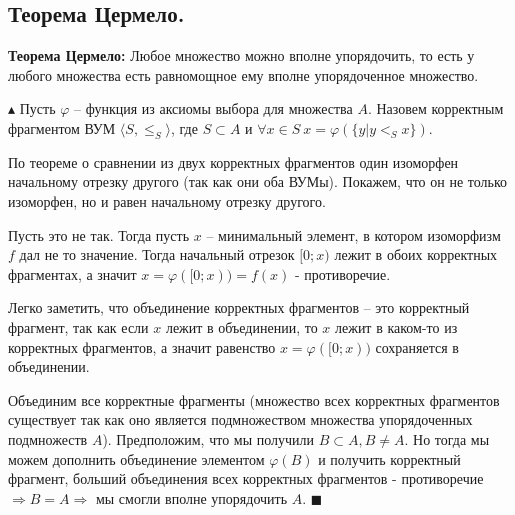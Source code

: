 \subsection{Теорема Цермело.}
\par \textbf{Теорема Цермело:} Любое множество можно вполне упорядочить, то есть у любого множества есть равномощное ему вполне упорядоченное множество.
\par $\blacktriangle$ Пусть $\varphi$ -- функция из аксиомы выбора для множества $A$. Назовем корректным фрагментом ВУМ $\langle S, \leq_S \rangle$, где $S \subset A$ и $\forall x \in S \: x=\varphi(\{y|y <_S x\})$.
\par По теореме о сравнении из двух корректных фрагментов один изоморфен начальному отрезку другого (так как они оба ВУМы). Покажем, что он не только изоморфен, но и равен начальному отрезку другого. 
\par Пусть это не так. Тогда пусть $x$ -- минимальный элемент, в котором изоморфизм $f$ дал не то значение. Тогда начальный отрезок $[0;x)$ лежит в обоих корректных фрагментах, а значит $x=\varphi([0;x))=f(x)$ - противоречие.
\par Легко заметить, что объединение корректных фрагментов -- это корректный фрагмент, так как если $x$ лежит в объединении, то $x$ лежит в каком-то из корректных фрагментов, а значит равенство $x=\varphi([0;x))$ сохраняется в объединении.
\par Объединим все корректные фрагменты (множество всех корректных фрагментов существует так как оно является подмножеством множества упорядоченных подмножеств $A$). Предположим, что мы получили $B \subset A, B \neq A$. Но тогда мы можем дополнить объединение элементом $\varphi(B)$ и получить корректный фрагмент, больший объединения всех корректных фрагментов - противоречие $\Rightarrow B=A \Rightarrow$ мы смогли вполне упорядочить $A$. $\blacksquare$


